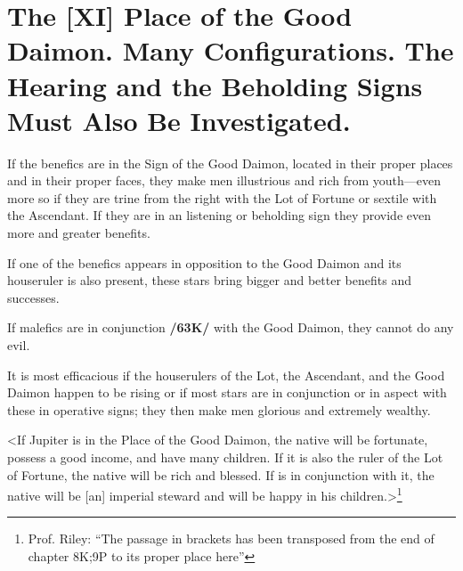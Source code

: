 \section{The [XI] Place of the Good Daimon. Many Configurations. The Hearing and the Beholding Signs Must Also Be Investigated.}

If the benefics are in the Sign of the Good Daimon, located in their proper places and in their proper faces, they make men illustrious and rich from youth—even more so if they are trine from the right with the Lot of Fortune or sextile with the Ascendant. If they are in an listening or beholding sign they provide even more and greater benefits. 

If one of the benefics appears in opposition to the Good Daimon and its houseruler is also present, these stars bring bigger and better benefits and successes. 

If malefics are in conjunction \textbf{/63K/} with the Good Daimon, they cannot do any evil. 

It is most efficacious if the houserulers of the Lot, the Ascendant, and the Good Daimon happen to be rising or if most stars are in conjunction or in aspect with these in operative signs; they then make men glorious and extremely wealthy. 

<If Jupiter is in the Place of the Good Daimon, the native will be fortunate, possess a good income, and have many
children. If it is also the ruler of the Lot of Fortune, the native will be rich and blessed. If \Mercury\xspace is in conjunction with it, the native will be [an] imperial steward and will be happy in his children.>\footnote{Prof. Riley: ``The passage in brackets has been transposed from the end of chapter 8K;9P to its proper place here''}

\newpage